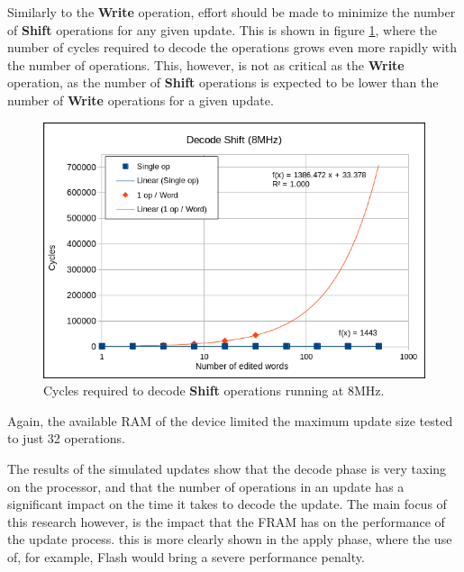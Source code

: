 Similarly to the \textbf{Write} operation, effort should be made to minimize the number of \textbf{Shift} operations for any given update. This is shown in figure \ref{fig:sDecode8}, where the number of cycles required to decode the operations grows even more rapidly with the number of operations. This, however, is not as critical as the \textbf{Write} operation, as the number of \textbf{Shift} operations is expected to be lower than the number of \textbf{Write} operations for a given update. 
\begin{figure}[!ht]
    \begin{shaded}
        \centering
        \includegraphics[width=\figurewidth]{img/SDecode8.png}
        \caption{Cycles required to decode \textbf{Shift} operations running at 8MHz.}
        \label{fig:sDecode8}
    \end{shaded}
\end{figure}
Again, the available RAM of the device limited the maximum update size tested to just 32 operations. 

The results of the simulated updates show that the decode phase is very taxing on the processor, and that the number of operations in an update has a significant impact on the time it takes to decode the update. The main focus of this research however, is the impact that the FRAM has on the performance of the update process. this is more clearly shown in the apply phase, where the use of, for example, Flash would bring a severe performance penalty.

